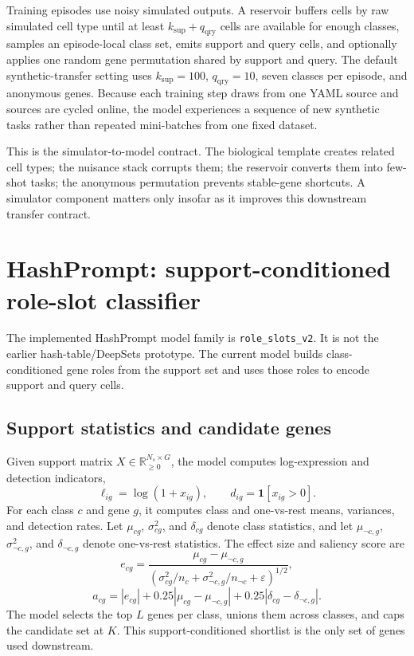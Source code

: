 \documentclass{article}
\newcommand{\R}{\mathbb{R}}
\newcommand{\eps}{\varepsilon}
\begin{document}
Training episodes use noisy simulated outputs. A reservoir buffers cells by raw simulated cell type until at least \(k_{\mathrm{sup}}+q_{\mathrm{qry}}\) cells are available for enough classes, samples an episode-local class set, emits support and query cells, and optionally applies one random gene permutation shared by support and query. The default synthetic-transfer setting uses \(k_{\mathrm{sup}}=100\), \(q_{\mathrm{qry}}=10\), seven classes per episode, and anonymous genes. Because each training step draws from one YAML source and sources are cycled online, the model experiences a sequence of new synthetic tasks rather than repeated mini-batches from one fixed dataset.

This is the simulator-to-model contract. The biological template creates related cell types; the nuisance stack corrupts them; the reservoir converts them into few-shot tasks; the anonymous permutation prevents stable-gene shortcuts. A simulator component matters only insofar as it improves this downstream transfer contract.

\section{HashPrompt: support-conditioned role-slot classifier}

The implemented HashPrompt model family is \texttt{role\_slots\_v2}. It is not the earlier hash-table/DeepSets prototype. The current model builds class-conditioned gene roles from the support set and uses those roles to encode support and query cells.

\subsection{Support statistics and candidate genes}

Given support matrix \(X\in\R_{\ge0}^{N_s\times G}\), the model computes log-expression and detection indicators,
\begin{equation}
    \ell_{ig}=\log(1+x_{ig}),
    \qquad
    d_{ig}=\mathbf{1}[x_{ig}>0].
\end{equation}
For each class \(c\) and gene \(g\), it computes class and one-vs-rest means, variances, and detection rates. Let \(\mu_{cg}\), \(\sigma^2_{cg}\), and \(\delta_{cg}\) denote class statistics, and let \(\mu_{\neg c,g}\), \(\sigma^2_{\neg c,g}\), and \(\delta_{\neg c,g}\) denote one-vs-rest statistics. The effect size and saliency score are
\begin{equation}
    e_{cg}=\frac{\mu_{cg}-\mu_{\neg c,g}}{(\sigma^2_{cg}/n_c+\sigma^2_{\neg c,g}/n_{\neg c}+\eps)^{1/2}},
\end{equation}
\begin{equation}
    a_{cg}=|e_{cg}|+0.25|\mu_{cg}-\mu_{\neg c,g}|+0.25|\delta_{cg}-\delta_{\neg c,g}|.
\end{equation}
The model selects the top \(L\) genes per class, unions them across classes, and caps the candidate set at \(K\). This support-conditioned shortlist is the only set of genes used downstream.
\end{document}
